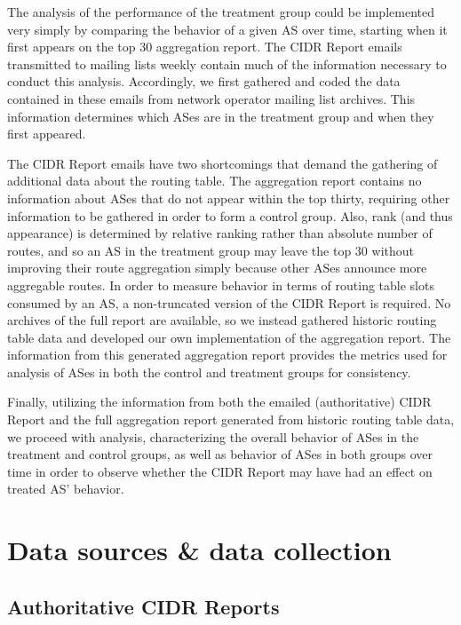 The analysis of the performance of the treatment group could be implemented
very simply by comparing the behavior of a given AS over time, starting when it
first appears on the top 30 aggregation report. The CIDR Report emails
transmitted to mailing lists weekly contain much of the information necessary
to conduct this analysis. Accordingly, we first gathered and coded the data
contained in these emails from network operator mailing list archives. This
information determines which ASes are in the treatment group and when they
first appeared.

The CIDR Report emails have two shortcomings that demand the gathering of
additional data about the routing table. The aggregation report contains no
information about ASes that do not appear within the top thirty, requiring
other information to be gathered in order to form a control group. Also, rank
(and thus appearance) is determined by relative ranking rather than absolute
number of routes, and so an AS in the treatment group may leave the top 30
without improving their route aggregation simply because other ASes announce
more aggregable routes. In order to measure behavior in terms of routing table
slots consumed by an AS, a non-truncated version of the CIDR Report is
required. No archives of the full report are available, so we instead gathered
historic routing table data and developed our own implementation of the
aggregation report. The information from this generated aggregation report
provides the metrics used for analysis of ASes in both the control and
treatment groups for consistency.

Finally, utilizing the information from both the emailed (authoritative) CIDR
Report and the full aggregation report generated from historic routing table
data, we proceed with analysis, characterizing the overall behavior of ASes in
the treatment and control groups, as well as behavior of ASes in both groups
over time in order to observe whether the CIDR Report may have had an effect on
treated AS' behavior.

\section{Data sources \& data collection} %

\subsection{Authoritative CIDR Reports}

